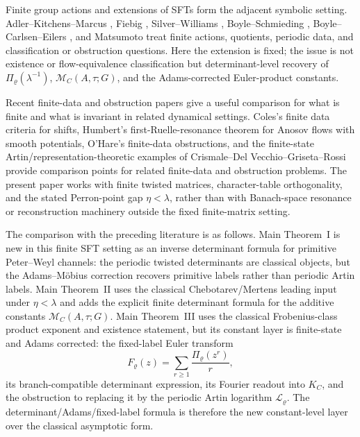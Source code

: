 \documentclass[11pt,a4paper]{amsart}
\theoremstyle{plain}
\theoremstyle{definition}
\theoremstyle{remark}
\begin{document}
Finite group actions and extensions of SFTs form the adjacent symbolic
setting.  Adler--Kitchens--Marcus \cite{AdlerKitchensMarcus1985FiniteGroupActions},
Fiebig \cite{Fiebig1993PeriodicFiniteGroupActions}, Silver--Williams
\cite{SilverWilliams2005InvariantFiniteGroupActions}, Boyle--Schmieding
\cite{BoyleSchmieding2017FiniteGroupExtensions}, Boyle--Carlsen--Eilers
\cite{BoyleCarlsenEilers2020FlowEquivalenceGSFT}, and Matsumoto
\cite{Matsumoto2016ExtensionsSubshiftsFiniteGroups} treat finite actions,
quotients, periodic data, and classification or obstruction questions.
Here the extension is fixed; the issue is not existence or
flow-equivalence classification but determinant-level recovery of
\(\Pi_\varrho(\lambda^{-1})\), \(\mathcal M_C(A,\tau;G)\), and the
Adams-corrected Euler-product constants.

Recent finite-data and obstruction papers give a useful comparison for what is
finite and what is invariant in related dynamical settings.  Coles's finite
data criteria for shifts, Humbert's first-Ruelle-resonance theorem for Anosov
flows with smooth potentials, O'Hare's finite-data obstructions, and
the finite-state Artin/representation-theoretic examples of
Crismale--Del Vecchio--Griseta--Rossi
\cite{Coles2025VassilievWritheAxiomA,Humbert2025FirstRuelleResonance,OHare2025FiniteDataRigidity,CrismaleDelVecchioGrisetaRossi2025NoncommutativeSkewProduct}
provide comparison points for related finite-data and obstruction problems.
The present paper works with finite twisted matrices, character-table
orthogonality, and the stated Perron-point gap \(\eta<\lambda\), rather than
with Banach-space resonance or reconstruction machinery outside the fixed
finite-matrix setting.

The comparison with the preceding literature is as follows.  Main Theorem~I is new in
this finite SFT setting as an inverse determinant formula for primitive
Peter--Weyl channels: the periodic twisted determinants are classical objects,
but the Adams--M\"obius correction recovers primitive labels rather than
periodic Artin labels.  Main Theorem~II uses the classical Chebotarev/Mertens
leading input under \(\eta<\lambda\) and adds the explicit finite determinant
formula for the additive constants \(\mathcal M_C(A,\tau;G)\).  Main
Theorem~III uses the classical Frobenius-class product exponent and existence
statement, but its constant layer is finite-state and Adams corrected: the
fixed-label Euler transform
\[
  F_\varrho(z)=\sum_{r\ge1}\frac{\Pi_\varrho(z^r)}{r},
\]
its branch-compatible determinant expression, its Fourier readout into
\(K_C\), and the obstruction to replacing it by the periodic Artin logarithm
\(\mathcal L_\varrho\).  The determinant/Adams/fixed-label formula is therefore
the new constant-level layer over the classical asymptotic form.
\end{document}
